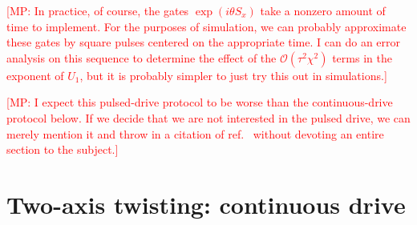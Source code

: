 \documentclass[aps,notitlepage,nofootinbib,11pt]{revtex4-1}
\newcommand{\p}[1]{\left(#1\right)} %
\renewcommand{\O}{\mathcal{O}}
\newcommand{\1}{\mathds{1}}
\newcommand{\note}[1]{\textcolor{red}{#1}}
\begin{document}
\note{[MP: In practice, of course, the gates $\exp\p{i\theta S_x}$
  take a nonzero amount of time to implement.  For the purposes of
  simulation, we can probably approximate these gates by square pulses
  centered on the appropriate time.  I can do an error analysis on
  this sequence to determine the effect of the $\O\p{\tau^2\chi^2}$
  terms in the exponent of $U_1$, but it is probably simpler to just
  try this out in simulations.]}

\note{[MP: I expect this pulsed-drive protocol to be worse than the
  continuous-drive protocol below.  If we decide that we are not
  interested in the pulsed drive, we can merely mention it and throw
  in a citation of ref.~\cite{liu2011spin} without devoting an entire
  section to the subject.]}


\section{Two-axis twisting: continuous drive}
\end{document}
